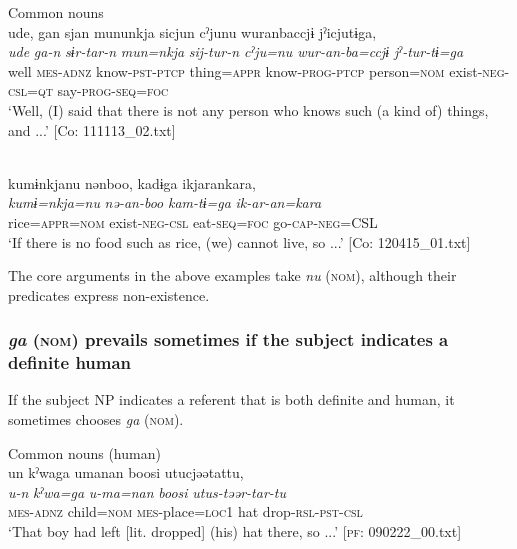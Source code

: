 \ea\label{ex:6-131}
 Common nouns\\

 \ea
 {\TM}
\glll  ude,  gan  sjan  mununkja  sicjun     cˀjunu  wuranbaccjɨ  jˀicjutɨga,\\
\textit{ude}  \textit{ga-n}  \textit{sɨr-tar-n}  \textit{mun=nkja}  \textit{sij-tur-n  \textit{cˀju=nu}  \textit{wur-an-ba=ccjɨ}  \textit{jˀ-tur-tɨ=ga}}\\
well  \textsc{mes}-\textsc{adnz}  know-\textsc{pst}-\textsc{ptcp}  thing=\textsc{appr}  know-\textsc{prog}-\textsc{ptcp}  person=\textsc{nom}  exist-\textsc{neg}-\textsc{csl}=\textsc{qt}  say-\textsc{prog}-\textsc{seq}=\textsc{foc}\\
\glt ‘Well, (I) said that there is not any person who knows such (a kind of) things, and ...’ [Co: 111113\_02.txt]

\ex\relax[= (\ref{ex:6-48}a)]\\
{\TM}
\glll  kumɨnkjanu  nənboo,  kadɨga  ikjarankara,\\
\textit{kumɨ=nkja=nu}  \textit{nə-an-boo}  \textit{kam-tɨ=ga}  \textit{ik-ar-an=kara}\\
rice=\textsc{appr}=\textsc{nom}  exist-\textsc{neg}-\textsc{csl}  eat-\textsc{seq}=\textsc{foc}  go-\textsc{cap}-\textsc{neg}=CSL\\
\glt ‘If there is no food such as rice, (we) cannot live, so ...’ [Co: 120415\_01.txt]
\z
\z

The core arguments in the above examples take \textit{nu} (\textsc{nom}), although their predicates express non-existence.

\subsubsection{\textit{ga} (\textsc{nom}) prevails sometimes if the subject indicates a definite human}

If the subject NP indicates a referent that is both definite and human, it sometimes chooses \textit{ga} (\textsc{nom}).

\ea\label{ex:6-132}
 Common nouns (human)\\

 \ea
 {\TM}
\glll  un  kˀwaga  umanan  {\textbar}boosi{\textbar}  utucjəətattu,\\
\textit{u-n}  \textit{kˀwa=ga}  \textit{u-ma=nan}  \textit{boosi}  \textit{utus-təər-tar-tu}\\
\textsc{mes}-\textsc{adnz}  child=\textsc{nom}  \textsc{mes}-place=\textsc{loc1}  hat  drop-\textsc{rsl}-\textsc{pst}-\textsc{csl}\\
\glt ‘That boy had left [lit. dropped] (his) hat there, so ...’ [\textsc{pf}: 090222\_00.txt]

